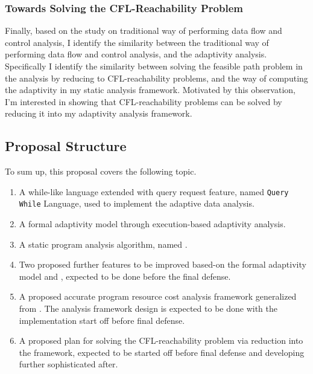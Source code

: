 \subsubsection{Towards Solving the CFL-Reachability Problem}
\label{subsec:intro-cfl}

Finally, based on the study on traditional way of performing data flow and control analysis,
I identify the similarity between the traditional way of performing data flow and control analysis, and the 
   adaptivity analysis.  
   Specifically I identify the similarity between 
   solving the feasible path problem in the analysis by reducing to CFL-reachability problems,
   and the way of computing the adaptivity in my static analysis framework.
   Motivated by this observation, 
   I'm interested in showing that
   CFL-reachability problems can be solved by reducing it into my adaptivity analysis framework.


\subsection{Proposal Structure}
\label{subsec:intro-structure}

To sum up, this proposal covers the following topic.
\begin{enumerate}
\item A while-like language extended with query request feature, named {\tt Query While} Language, 
used to implement 
the adaptive data analysis.
\item A formal adaptivity model through execution-based adaptivity analysis.
\item A static program analysis algorithm, named {\THESYSTEM}.
\item Two proposed further features to be improved based-on the formal adaptivity model and {\THESYSTEM},
 expected to be done before the final defense.
\item A proposed accurate program resource cost analysis framework generalized from {\THESYSTEM}. 
The analysis framework design is expected to be done with the implementation start off before final defense.
\item A proposed plan for solving the CFL-reachability problem via reduction into the {\THESYSTEM} framework,
expected to be started off before final defense and developing further sophisticated after.
\end{enumerate}